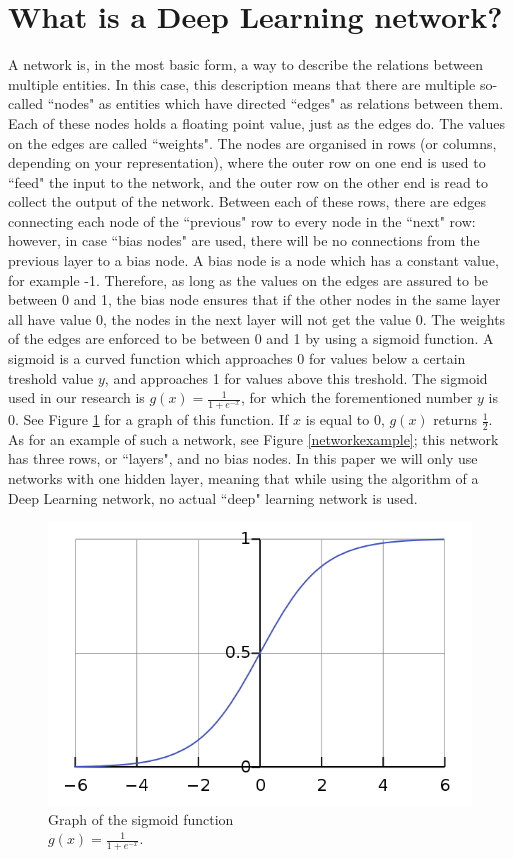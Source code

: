 \documentclass[a4paper, 10pt, notitlepage, twocolumn]{article}
\begin{document}
 \section{What is a Deep Learning network?}
 \label{what}
    A network is,  in the most basic form,  a way to describe the relations between multiple entities. In this case,  this description means that there are multiple so-called ``nodes" as entities which have directed ``edges" as relations between them. Each of these nodes holds a floating point value,  just as the edges do. The values on the edges are called ``weights". The nodes are organised in rows (or columns,  depending on your representation),  where the outer row on one end is used to ``feed" the input to the network,  and the outer row on the other end is read to collect the output of the network. Between each of these rows,  there are edges connecting each node of the ``previous" row to every node in the ``next" row: however,  in case ``bias nodes" are used,  there will be no connections from the previous layer to a bias node. A bias node is a node which has a constant value,  for example -1. Therefore,  as long as the values on the edges are assured to be between 0 and 1,  the bias node ensures that if the other nodes in the same layer all have value 0,  the nodes in the next layer will not get the value 0. The weights of the edges are enforced to be between 0 and 1 by using a sigmoid function. A sigmoid is a curved function which approaches 0 for values below a certain treshold value $y$,  and approaches 1 for values above this treshold. The sigmoid used in our research is $g(x) = \frac{1}{1 + e^{-x}}$,  for which the forementioned number $y$ is 0. See Figure \ref{sigmoid} for a graph of this function. If $x$ is equal to 0,  $g(x)$ returns $\frac{1}{2}$. As for an example of such a network,  see Figure \ref{networkexample}; this network has three rows,  or ``layers",  and no bias nodes. In this paper we will only use networks with one hidden layer,  meaning that while using the algorithm of a Deep Learning network,  no actual ``deep" learning network is used.\\
    \begin{figure}
       \centering
       \includegraphics[width=.45\textwidth]{sigmoid}
       \caption{Graph of the sigmoid function\\$g(x) = \frac{1}{1 + e^{-x}}$.}
       \label{sigmoid}
    \end{figure}
\end{document}
